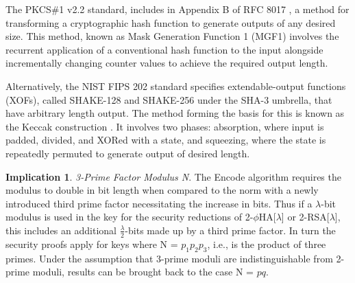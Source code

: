 \documentclass[]{final_report}
\theoremstyle{definition}
\newtheorem{implication}{Implication}
\begin{document}
The PKCS\#1 v2.2 standard, includes in Appendix B of RFC 8017 \cite{rfc8017}, a method for transforming a cryptographic hash function to generate outputs of any desired size. This method, known as Mask Generation Function 1 (MGF1) involves the recurrent application of a conventional hash function to the input alongside incrementally changing counter values to achieve the required output length.

Alternatively, the NIST FIPS 202 standard \cite{1421} specifies extendable-output functions (XOFs), called SHAKE-128 and SHAKE-256 under the SHA-3 umbrella, that have arbitrary length output. The method forming the basis for this is known as the Keccak construction \cite{bertoni2011keccak}. It involves two phases: absorption, where input is padded, divided, and XORed with a state, and squeezing, where the state is repeatedly permuted to generate output of desired length.

\begin{implication} \textit{3-Prime Factor Modulus N}.
\label{IMP:3prime}
The Encode algorithm requires the modulus to double in bit length when compared to the norm with a newly introduced third prime factor necessitating the increase in bits. Thus if a \(\lambda\)-bit modulus is used in the key for the security reductions of 2-$\phi$HA[$\lambda$] or 2-RSA[\(\lambda\)], this includes an additional \(\frac{\lambda}{2}\)-bits made up by a third prime factor. In turn the security proofs apply for keys where N = $p_1 p_2 p_3$, i.e., is the product of three primes. Under the assumption that 3-prime moduli are indistinguishable from 2-prime moduli, results can be brought back to the case N = $p q$.
\end{implication}
\end{document}
